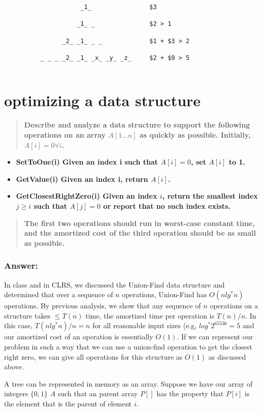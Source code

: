\documentclass[titlepage]{article}\usepackage[]{graphicx}\usepackage[]{color}
\begin{document}
\begin{verbatim}
                     _1_                $3  

                    _1_ _               $2 > 1

                _2_ _1_ _ _             $1 + $3 > 2

          _ _ _ _2_ _1_ _x_ _y_ _z_     $2 + $9 > 5
            
\end{verbatim}

\section{optimizing a data structure}
\begin{quote}
  \textbf{Describe and analyze a data structure to support the following
	operations on an array $A[1\dots n]$ as quickly as possible. Initially, $A[i]
  = 0 \forall i$.}
\end{quote}

\begin{itemize}
  \item \textbf{SetToOne(i) Given an index i such that $A[i] = 0$, set $A[i]$ to 1.}
  \item \textbf{GetValue(i) Given an index i, return $A[i]$. }
  \item \textbf{GetClosestRightZero(i) Given an index $i$, return the smallest
	index $j \geq i$ such that $A[j] = 0$ or report that no such index exists.}
\end{itemize}
\begin{quote}
  \textbf{The first two operations should run in worst-case constant time, and
  the amortized cost of the third operation should be as small as possible.}
\end{quote}

\subsubsection{Answer: }
In class and in CLRS, we discussed the Union-Find data structure and determined
that over a sequence of $n$ operations, Union-Find has $O(n lg^* n)$
operations. By previous analysis, we show that any sequence of $n$ operations
on a structure takes $\leq T(n)$ time, the amortized time per operation is
$T(n)/n$. In this case, $T(n lg^* n)/n = n$ for all reasonable input sizes
(e.g, $log^* 2^{65536} = 5$ and our amortized cost of an operation is essentially 
$O(1)$. 
If we can represent our problem in such a way that we can use a union-find
operation to get the closest right zero, we can give all operations for this
structure as $O(1)$ as discussed above. 

A tree can be represented in memory as an array. Suppose we have our array of
integers $\{ 0, 1\}$ $A$ such that an parent array $P[]$ has the property that
$P[i]$ is the element that is the parent of element $i$.  
\end{document}
